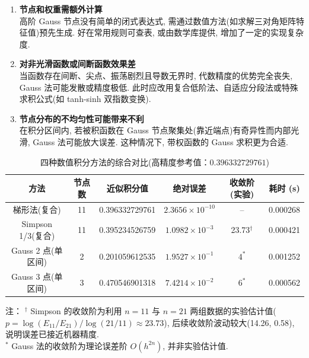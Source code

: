 \documentclass[zihao=-4,a4paper]{ctexart}
\begin{document}

\begin{enumerate}[rightmargin=0.5cm]
\item \textbf{节点和权重需额外计算} \\
  高阶 Gauss 节点没有简单的闭式表达式, 需通过数值方法(如求解三对角矩阵特征值)预先生成. 好在常用规则可查表, 或由数学库提供, 增加了一定的实现复杂度. 

\item \textbf{对非光滑函数或间断函数效果差} \\
  当函数存在间断、尖点、振荡剧烈且导数无界时, 代数精度的优势完全丧失, Gauss 法可能发散或精度极低. 此时应改用复合低阶法、自适应分段法或特殊求积公式(如 tanh-sinh 双指数变换). 

\item \textbf{节点分布的不均匀性可能带来不利} \\
  在积分区间内, 若被积函数在 Gauss 节点聚集处(靠近端点)有奇异性而内部光滑, Gauss 法可能放大误差. 这种情况下, 带权函数的 Gauss 求积更为合适. 
\end{enumerate}



\begin{table}[H]
\centering
\caption{四种数值积分方法的综合对比(高精度参考值：$0.396332729761$)}
\label{tab:big_comparison}
\small
\begin{tabular}{cccccc}
    \toprule
    方法 & 节点数 & 近似积分值 & 绝对误差 & 收敛阶(实验) & 耗时 (s) \\
    \midrule
    梯形法(复合)      & 11  & 0.396332729761 & $2.3656\times10^{-10}$ & --           & 0.000268 \\
    Simpson 1/3(复合) & 11  & 0.395234526759 & $1.0982\times10^{-3}$  & 23.73$^\dag$ & 0.000421 \\
    Gauss 2 点(单区间)& 2   & 0.201059612535 & $1.9527\times10^{-1}$  & $4^*$        & 0.001252 \\
    Gauss 3 点(单区间)& 3   & 0.470546901318 & $7.4214\times10^{-2}$  & $6^*$        & 0.000562 \\
    \bottomrule
\end{tabular}

\vspace{4pt}
\footnotesize
注：  
$^\dag$ Simpson 的收敛阶为利用 $n=11$ 与 $n=21$ 两组数据的实验估计值($p = \log(E_{11}/E_{21}) / \log(21/11) \approx 23.73$), 后续收敛阶波动较大(14.26, 0.58), 说明误差已接近机器精度. \\
$^*$ Gauss 法的收敛阶为理论误差阶 $O(h^{2n})$, 并非实验估计值. 
\end{table}
\end{document}
